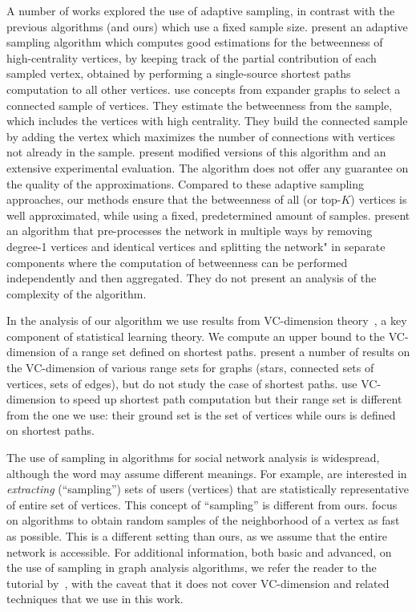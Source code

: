 A number of works explored
the use of adaptive sampling, in contrast with the previous algorithms (and
ours) which use a fixed sample size. \citet{BaderKMM07} present an adaptive
sampling algorithm which computes good estimations for the betweenness of
high-centrality vertices, by keeping track of the partial contribution of each
sampled vertex, obtained by performing a single-source shortest paths
computation to all other vertices. \citet{MaiyaBW10} use concepts from expander
graphs to select a connected sample of vertices. They estimate the betweenness
from the sample, which includes the vertices with high centrality. They build
the connected sample by adding the vertex which maximizes the number of
connections with vertices not already in the sample. \citet{LimMRTB11} present
modified versions of this algorithm and an extensive experimental evaluation.
The algorithm does not offer any guarantee on the quality of the approximations.
Compared to these adaptive sampling approaches, our methods ensure that the
betweenness of all (or top-$K$) vertices is well approximated, while using a
fixed, predetermined amount of samples.  \citet{SaryuceSKC13} present an
algorithm that pre-processes the network in multiple ways by removing degree-1
vertices and identical vertices and splitting the network" in separate
components where the computation of betweenness can be performed independently
and then aggregated. They do not present an analysis of the complexity of the
algorithm. 

In the analysis of our algorithm we use results from VC-dimension
theory~\citep{VapnikC71}, a key component of statistical learning theory. We
compute an upper bound to the VC-dimension of a range set defined on shortest
paths. \citet{KranakisKRUW97} present a number of results on the VC-dimension of
various range sets for graphs (stars, connected sets of vertices, sets of
edges), but do not study the case of shortest paths. \citet{AbrahamDFGW11} use
VC-dimension to speed up shortest path computation but their range set is
different from the one we use: their ground set is the set of vertices while
ours is defined on shortest paths.

The use of sampling in algorithms for social network analysis is widespread,
although the word may assume different meanings. For example, \citet{TangZCZS15}
are interested in \emph{extracting} (``sampling'') sets of users (vertices) that
are statistically representative of entire set of vertices. This concept of
``sampling'' is different from ours. \citet{PapagelisDK13} focus on algorithms
to obtain random samples of the neighborhood of a vertex as fast as possible.
This is a different setting than ours, as we assume that the entire network is
accessible. For additional information, both basic and advanced, on the use of
sampling in graph analysis algorithms, we refer the reader to the tutorial
by~\citet{CormodeD14}, with the caveat that it does not cover VC-dimension and
related techniques that we use in this work.

